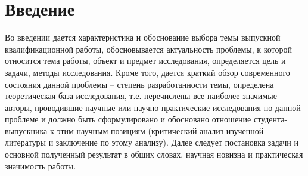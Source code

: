 \chapter*{Введение}

Во введении дается характеристика и обоснование выбора темы выпускной квалификационной работы, обосновывается актуальность проблемы, к которой относится тема работы, объект и предмет исследования, определяется цель и задачи, методы исследования. Кроме того, дается краткий обзор современного состояния данной проблемы – степень разработанности темы, определена теоретическая база исследования, т.е. перечислены все наиболее значимые авторы, проводившие научные или научно-практические исследования по данной проблеме и должно быть сформулировано и обосновано отношение студента-выпускника к этим научным позициям (критический анализ изученной литературы и заключение по этому анализу). Далее следует постановка задачи и основной полученный результат в общих словах, научная новизна и практическая значимость работы.
